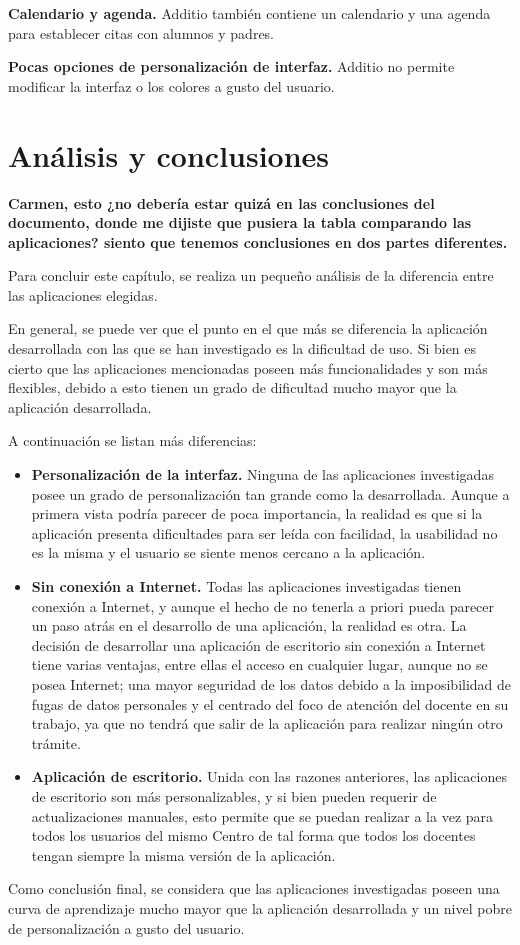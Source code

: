 \textbf {Calendario y agenda.} Additio también contiene un calendario y una agenda para establecer citas con alumnos y padres.

\textbf {Pocas opciones de personalización de interfaz.} Additio no permite modificar la interfaz o los colores a gusto del usuario.


\section{Análisis y conclusiones}

\textbf{Carmen, esto ¿no debería estar quizá en las conclusiones del documento, donde me dijiste que pusiera la tabla comparando las aplicaciones? siento que tenemos conclusiones en dos partes diferentes.}

Para concluir este capítulo, se realiza un pequeño análisis de la diferencia entre las aplicaciones elegidas.

En general, se puede ver que el punto en el que más se diferencia la aplicación desarrollada con las que se han investigado es la dificultad de uso. Si bien es cierto que las aplicaciones mencionadas poseen más funcionalidades y son más flexibles, debido a esto tienen un grado de dificultad mucho mayor que la aplicación desarrollada.

A continuación se listan más diferencias:
\begin{itemize}
\item \textbf{Personalización de la interfaz.} Ninguna de las aplicaciones investigadas posee un grado de personalización tan grande como la desarrollada. Aunque a primera vista podría parecer de poca importancia, la realidad es que si la aplicación presenta dificultades para ser leída con facilidad, la usabilidad no es la misma y el usuario se siente menos cercano a la aplicación.
\item \textbf{Sin conexión a Internet.} Todas las aplicaciones investigadas tienen conexión a Internet, y aunque el hecho de no tenerla a priori pueda parecer un paso atrás en el desarrollo de una aplicación, la realidad es otra. La decisión de desarrollar una aplicación de escritorio sin conexión a Internet tiene varias ventajas, entre ellas el acceso en cualquier lugar, aunque no se posea Internet; una mayor seguridad de los datos debido a la imposibilidad de fugas de datos personales y el centrado del foco de atención del docente en su trabajo, ya que no tendrá que salir de la aplicación para realizar ningún otro trámite.
\item \textbf{Aplicación de escritorio.} Unida con las razones anteriores, las aplicaciones de escritorio son más personalizables, y si bien pueden requerir de actualizaciones manuales, esto permite que se puedan realizar a la vez para todos los usuarios del mismo Centro de tal forma que todos los docentes tengan siempre la misma versión de la aplicación.
\end{itemize}

Como conclusión final, se considera que las aplicaciones investigadas poseen una curva de aprendizaje mucho mayor que la aplicación desarrollada y un nivel pobre de personalización a gusto del usuario.